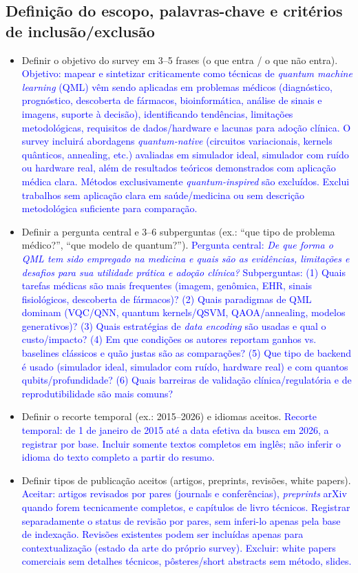 \documentclass[11pt]{article}
\begin{document}
\subsection{Definição do escopo, palavras-chave e critérios de inclusão/exclusão}
\begin{itemize}
  \item [ ] Definir o objetivo do survey em 3--5 frases (o que entra / o que não entra). \textcolor{blue}{Objetivo: mapear e sintetizar criticamente como técnicas de \emph{quantum machine learning} (QML) vêm sendo aplicadas em problemas médicos (diagnóstico, prognóstico, descoberta de fármacos, bioinformática, análise de sinais e imagens, suporte à decisão), identificando tendências, limitações metodológicas, requisitos de dados/hardware e lacunas para adoção clínica. O survey incluirá abordagens \emph{quantum-native} (circuitos variacionais, kernels quânticos, annealing, etc.) avaliadas em simulador ideal, simulador com ruído ou hardware real, além de resultados teóricos demonstrados com aplicação médica clara. Métodos exclusivamente \emph{quantum-inspired} são excluídos. Exclui trabalhos sem aplicação clara em saúde/medicina ou sem descrição metodológica suficiente para comparação.}
  \item [ ] Definir a pergunta central e 3--6 subperguntas (ex.: ``que tipo de problema médico?'', ``que modelo de quantum?''). \textcolor{blue}{Pergunta central: \emph{De que forma o QML tem sido empregado na medicina e quais são as evidências, limitações e desafios para sua utilidade prática e adoção clínica?} Subperguntas: (1) Quais tarefas médicas são mais frequentes (imagem, genômica, EHR, sinais fisiológicos, descoberta de fármacos)? (2) Quais paradigmas de QML dominam (VQC/QNN, quantum kernels/QSVM, QAOA/annealing, modelos generativos)? (3) Quais estratégias de \emph{data encoding} são usadas e qual o custo/impacto? (4) Em que condições os autores reportam ganhos vs. baselines clássicos e quão justas são as comparações? (5) Que tipo de backend é usado (simulador ideal, simulador com ruído, hardware real) e com quantos qubits/profundidade? (6) Quais barreiras de validação clínica/regulatória e de reprodutibilidade são mais comuns?}
  \item [ ] Definir o recorte temporal (ex.: 2015--2026) e idiomas aceitos. \textcolor{blue}{Recorte temporal: de 1 de janeiro de 2015 até a data efetiva da busca em 2026, a registrar por base. Incluir somente textos completos em inglês; não inferir o idioma do texto completo a partir do resumo.}
  \item [ ] Definir tipos de publicação aceitos (artigos, preprints, revisões, white papers). \textcolor{blue}{Aceitar: artigos revisados por pares (journals e conferências), \emph{preprints} arXiv quando forem tecnicamente completos, e capítulos de livro técnicos. Registrar separadamente o status de revisão por pares, sem inferi-lo apenas pela base de indexação. Revisões existentes podem ser incluídas apenas para contextualização (estado da arte do próprio survey). Excluir: white papers comerciais sem detalhes técnicos, pôsteres/short abstracts sem método, slides.}

\end{itemize}
\end{document}
